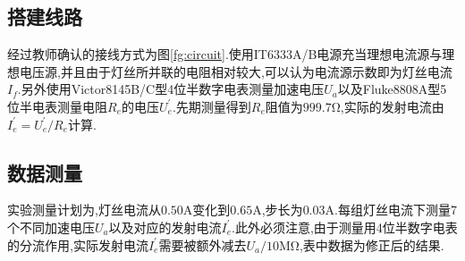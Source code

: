 \documentclass[UTF8,a4paper]{article}%
\begin{document}
\subsection{搭建线路}
经过教师确认的接线方式为图\ref{fg:circuit}.使用IT6333A/B电源充当理想电流源与理想电压源,并且由于灯丝所并联的电阻相对较大,可以认为电流源示数即为灯丝电流$I_f$.另外使用Victor8145B/C型4位半数字电表测量加速电压$U_a$以及Fluke8808A型5位半电表测量电阻$R_e$的电压$U_e^\prime$.先期测量得到$R_e$阻值为$\num{999,7}\unit{\ohm}$,实际的发射电流由$I_e^\prime=U_e^\prime/R_e$计算.
\subsection{数据测量}
实验测量计划为,灯丝电流从$\num{0.50}\unit{\A}$变化到$\num{0.65}\unit{\A}$,步长为$\num{0.03}\unit{\A}$.每组灯丝电流下测量7个不同加速电压$U_a$以及对应的发射电流$I_e^\prime$.此外必须注意,由于测量用4位半数字电表的分流作用,实际发射电流$I_e^\prime$需要被额外减去$U_a/10\unit{\mega\ohm}$,表中数据为修正后的结果.
\end{document}
